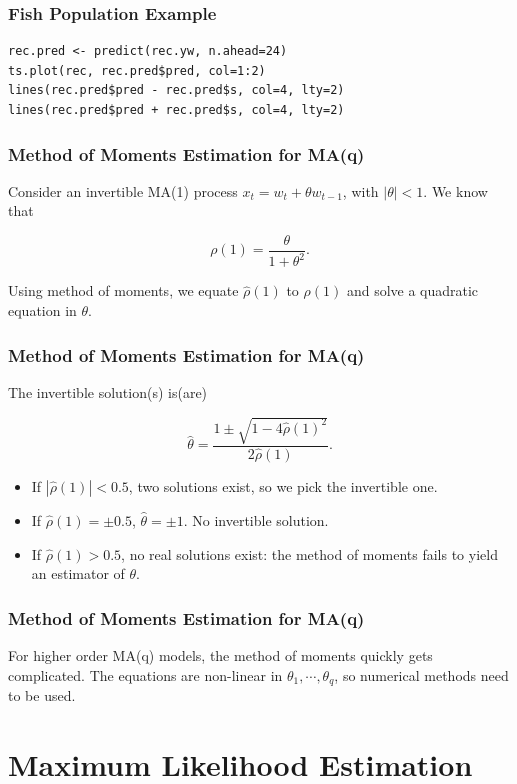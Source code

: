 \documentclass[%
xcolor=pdftex]{beamer}
\begin{document}
\begin{frame}[fragile]
\frametitle{Fish Population Example}

\begin{verbatim}
rec.pred <- predict(rec.yw, n.ahead=24)
ts.plot(rec, rec.pred$pred, col=1:2)
lines(rec.pred$pred - rec.pred$s, col=4, lty=2)
lines(rec.pred$pred + rec.pred$s, col=4, lty=2)
\end{verbatim}

\end{frame}

\begin{frame}
\frametitle{Method of Moments Estimation for MA(q)}

Consider an invertible MA(1) process $x_t = w_t + \theta w_{t-1}$, with $|\theta| < 1$. We know that

$$
\rho(1) = \frac{\theta}{1 + \theta^2}.
$$

Using method of moments, we equate $\hat{\rho}(1)$ to $\rho(1)$ and solve a quadratic equation in $\theta$.


\end{frame}

\begin{frame}
\frametitle{Method of Moments Estimation for MA(q)}

The invertible solution(s) is(are)

$$
\hat{\theta} = \frac{1 \pm \sqrt{1 - 4 \hat{\rho}(1)^2}}{2 \hat{\rho}(1)}.
$$
\begin{itemize}
\item If $|\hat{\rho}(1)| < 0.5$, two solutions exist, so we pick the invertible one. 
\item If $\hat{\rho}(1)= \pm 0.5$, $\hat{\theta} = \pm 1$. No invertible solution. 
\item If $\hat{\rho}(1)>0.5$, no real solutions exist: the method of moments fails to yield an estimator of $\theta$.
\end{itemize}

\end{frame}

\begin{frame}
\frametitle{Method of Moments Estimation for MA(q)}

For higher order MA(q) models, the method of moments quickly gets complicated. The equations are non-linear in $\theta_1, \cdots, \theta_q$, so numerical methods need to be used. 

\end{frame}

\section{Maximum Likelihood Estimation}
\frame{\tableofcontents[currentsection]}
\end{document}
